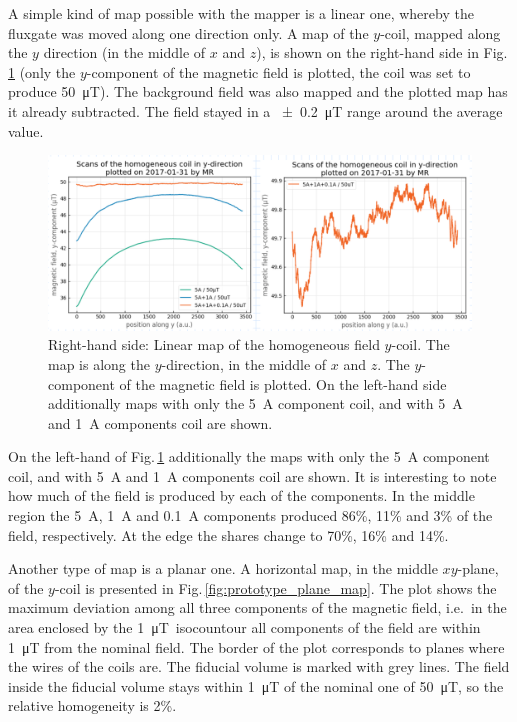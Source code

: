 A simple kind of map possible with the mapper is a linear one, whereby the fluxgate was moved along one direction only. A map of the $y$-coil, mapped along the $y$ direction (in the middle of $x$ and $z$), is shown on the right-hand side in Fig.\,\ref{fig:prototype_linear_map} (only the $y$-component of the magnetic field is plotted, the coil was set to produce \SI{50}{\micro\tesla}). The background field was also mapped and the plotted map has it already subtracted. The field stayed in a \SI{\pm 0.2}{\micro\tesla} range around the average value.

\begin{figure}
  \centering
  \includegraphics[width=0.9\linewidth]{gfx/prototype/linear_map.png}
  \caption{Right-hand side: Linear map of the homogeneous field $y$-coil. The map is along the $y$-direction, in the middle of $x$ and $z$. The $y$-component of the magnetic field is plotted. On the left-hand side additionally maps with only the \SI{5}{\ampere} component coil, and with \SI{5}{\ampere} and \SI{1}{\ampere} components coil are shown.}
  \label{fig:prototype_linear_map}
\end{figure}

On the left-hand of Fig.\,\ref{fig:prototype_linear_map} additionally the maps with only the \SI{5}{\ampere} component coil, and with \SI{5}{\ampere} and \SI{1}{\ampere} components coil are shown. It is interesting to note how much of the field is produced by each of the components. In the middle region the \SI{5}{\ampere}, \SI{1}{\ampere} and \SI{0.1}{\ampere} components produced 86\%, 11\% and 3\% of the field, respectively. At the edge the shares change to 70\%, 16\% and 14\%. 

Another type of map is a planar one. A horizontal map, in the middle $xy$-plane, of the $y$-coil is presented in Fig.\,\ref{fig:prototype_plane_map}. The plot shows the maximum deviation among all three components of the magnetic field, i.e.\ in the area enclosed by the \SI{1}{\micro\tesla}~isocountour all components of the field are within \SI{1}{\micro\tesla} from the nominal field. The border of the plot corresponds to planes where the wires of the coils are. The fiducial volume is marked with grey lines. The field inside the fiducial volume stays within \SI{1}{\micro\tesla} of the nominal one of \SI{50}{\micro\tesla}, so the relative homogeneity is 2\%.

